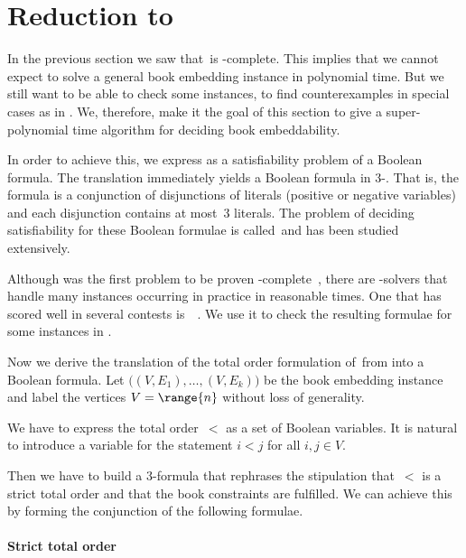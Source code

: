 \section{Reduction to \probThreeSat}
\label{section:sat}

In the previous section we saw that~\probBook is \NP-complete.
This implies that we cannot expect to solve a general book embedding instance in polynomial time. 
But we still want to be able to check some instances, \eg to find counterexamples in special
cases as in . We, therefore, make it the goal
of this section to give a super-polynomial time algorithm for deciding book embeddability.

In order to achieve this, we express \probBook as a satisfiability problem of a Boolean formula.
The translation immediately yields a Boolean formula in 3-\CNF. That is,
the formula is a conjunction of disjunctions of literals (positive or negative variables) and each
disjunction contains at most~3 literals. The problem of deciding satisfiability for
these Boolean formulae is called~\probThreeSat and has been studied extensively.


Although \probThreeSat was the first problem to be proven \NP-complete~\cite{Cook71}, there
are \SAT-solvers that handle many instances occurring in practice in reasonable times. One that
has scored well in several contests is~~\cite{minisat03}. We use it to 
check the resulting formulae for some instances in .

Now we derive the translation of the total order formulation of~\probBook from 
into a Boolean formula. Let $\bigl((V, E_1),\dotsc, (V, E_k)\bigr)$ be the book embedding 
instance and label the vertices $V = \range{n}$ without loss of generality. 

We have to express the total order~$<$ as a set of Boolean variables. 
It is natural to introduce a variable
 for the statement $i < j$ for all $i, j \in V$. 

Then we have to build a 3-\CNF formula that rephrases the stipulation that~$<$ is a
strict total order and that the book constraints are fulfilled. We can achieve this by forming the conjunction of the following formulae.

\paragraph{Strict total order}

